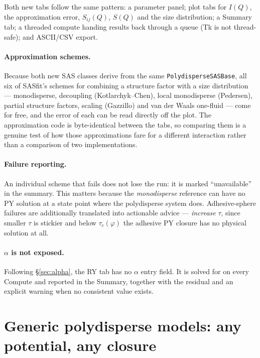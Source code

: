 \documentclass[11pt,a4paper]{article}
\newcommand{\code}[1]{\texttt{#1}}
\begin{document}
Both new tabs follow the same pattern: a parameter panel; plot tabs for
$I(Q)$, the approximation error, $S_{ij}(Q)$, $S(Q)$ and the size
distribution; a Summary tab; a threaded compute handing results back through a
queue (Tk is not thread-safe); and ASCII/CSV export.

\paragraph{Approximation schemes.} Because both new SAS classes derive from
the same \code{PolydisperseSASBase}, all six of SASfit's schemes for combining
a structure factor with a size distribution --- monodisperse, decoupling
(Kotlarchyk--Chen), local monodisperse (Pedersen), partial structure factors,
scaling (Gazzillo) and van der Waals one-fluid --- come for free, and the
error of each can be read directly off the plot. The approximation code is
byte-identical between the tabs, so comparing them is a genuine test of how
those approximations fare for a different interaction rather than a comparison
of two implementations.

\paragraph{Failure reporting.} An individual scheme that fails does not lose
the run: it is marked ``unavailable'' in the summary. This matters because the
\emph{monodisperse} reference can have no PY solution at a state point where
the polydisperse system does. Adhesive-sphere failures are additionally
translated into actionable advice --- \emph{increase} $\tau$, since smaller
$\tau$ is stickier and below $\tau_c(\varphi)$ the adhesive PY closure has no
physical solution at all.

\paragraph{$\alpha$ is not exposed.} Following \S\ref{sec:alpha}, the RY tab
has no $\alpha$ entry field. It is solved for on every Compute and reported in
the Summary, together with the residual and an explicit warning when no
consistent value exists.


\section{Generic polydisperse models: any potential, any closure}
\label{sec:generic}
\end{document}
